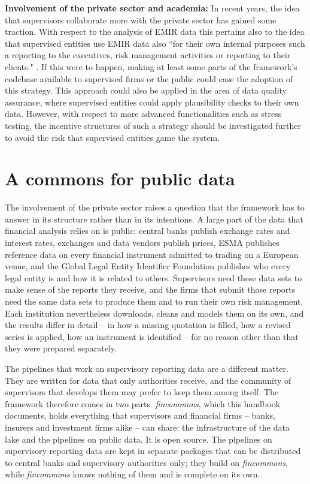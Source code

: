 \documentclass[a4paper, 11pt]{report}
\begin{document}
\textbf{Involvement of the private sector and academia:} In recent years, the idea that supervisors collaborate more with the private sector has gained some traction. With respect to the analysis of EMIR data this pertains also to the idea that supervised entities use EMIR data also ``for their own internal purposes such a reporting to the executives, risk management activities or reporting to their clients." \parencite[p.~5]{CSSF.2024}. If this were to happen, making at least some parts of the framework's codebase available to supervised firms or the public could ease the adoption of this strategy. This approach could also be applied in the area of data quality assurance, where supervised entities could apply plausibility checks to their own data. However, with respect to more advanced functionalities such as stress testing, the incentive structures of such a strategy should be investigated further to avoid the risk that supervised entities game the system.

\section{A commons for public data\label{sec:intro-fincommons}}

The involvement of the private sector raises a question that the framework has to answer in its structure rather than in its intentions. A large part of the data that financial analysis relies on is public: central banks publish exchange rates and interest rates, exchanges and data vendors publish prices, ESMA publishes reference data on every financial instrument admitted to trading on a European venue, and the Global Legal Entity Identifier Foundation publishes who every legal entity is and how it is related to others. Supervisors need these data sets to make sense of the reports they receive, and the firms that submit those reports need the same data sets to produce them and to run their own risk management. Each institution nevertheless downloads, cleans and models them on its own, and the results differ in detail -- in how a missing quotation is filled, how a revised series is applied, how an instrument is identified -- for no reason other than that they were prepared separately.

The pipelines that work on supervisory reporting data are a different matter. They are written for data that only authorities receive, and the community of supervisors that develops them may prefer to keep them among itself. The framework therefore comes in two parts. \emph{fincommons}, which this handbook documents, holds everything that supervisors and financial firms -- banks, insurers and investment firms alike -- can share: the infrastructure of the data lake and the pipelines on public data. It is open source. The pipelines on supervisory reporting data are kept in separate packages that can be distributed to central banks and supervisory authorities only; they build on \emph{fincommons}, while \emph{fincommons} knows nothing of them and is complete on its own.
\end{document}
